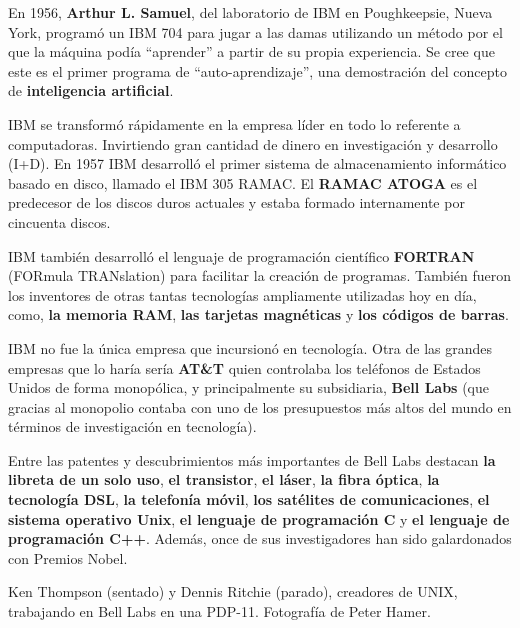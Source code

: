 \begin{knowwhat}
    En 1956, \textbf{Arthur L. Samuel}, del laboratorio de IBM en Poughkeepsie,
    Nueva York, programó un IBM 704 para jugar a las damas utilizando un método por
    el que la máquina podía ``aprender'' a partir de su propia experiencia. Se cree
    que este es el primer programa de ``auto-aprendizaje'', una demostración del
    concepto de \textbf{inteligencia artificial}.
\end{knowwhat}

IBM se transformó rápidamente en la empresa líder en todo lo referente a
computadoras. Invirtiendo gran cantidad de dinero en investigación y desarrollo
(I+D). En 1957 IBM desarrolló el primer sistema de almacenamiento informático
basado en disco, llamado el IBM 305 RAMAC. El \textbf{RAMAC ATOGA} es el
predecesor de los discos duros actuales y estaba formado internamente por
cincuenta discos.\autocite{pugh_1996}

\begin{knowwhat}
    IBM también desarrolló el lenguaje de programación científico \textbf{FORTRAN}
    (FORmula TRANslation) para facilitar la creación de programas. También fueron
    los inventores de otras tantas tecnologías ampliamente utilizadas hoy en día,
    como, \textbf{la memoria RAM}, \textbf{las tarjetas magnéticas} y \textbf{los
    códigos de barras}.
\end{knowwhat}

IBM no fue la única empresa que incursionó en tecnología. Otra de las grandes
empresas que lo haría sería \textbf{AT\&T} quien controlaba los teléfonos de
Estados Unidos de forma monopólica, y principalmente su subsidiaria,
\textbf{Bell Labs} (que gracias al monopolio contaba con uno de los presupuestos
más altos del mundo en términos de investigación en tecnología).

Entre las patentes y descubrimientos más importantes de Bell Labs destacan
\textbf{la libreta de un solo uso}, \textbf{el transistor}, \textbf{el láser},
\textbf{la fibra óptica}, \textbf{la tecnología DSL}, \textbf{la telefonía
móvil}, \textbf{los satélites de comunicaciones}, \textbf{el sistema operativo
Unix}, \textbf{el lenguaje de programación C} y \textbf{el lenguaje de
programación C++}. Además, once de sus investigadores han sido galardonados con
Premios Nobel.\autocite{gertner_2013}

{Ken Thompson (sentado) y Dennis Ritchie (parado), creadores de UNIX,
trabajando en Bell Labs en una PDP-11.}
{Fotografía de Peter Hamer.}

